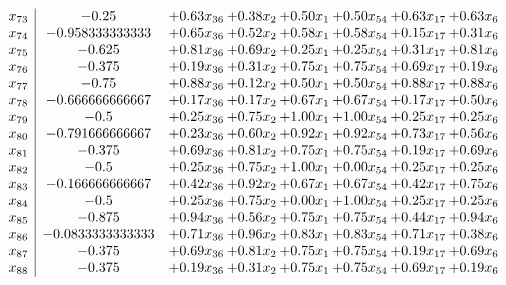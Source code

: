 \documentclass[8pt]{article}
\begin{document}
\[\begin{array}{c| c c@{\hskip 2pt} c@{\hskip 2pt} c@{\hskip 2pt} c@{\hskip 2pt} c@{\hskip 2pt} c@{\hskip 2pt} }
 x_{73}   &  -0.25 & +  0.63 x_{36} & +  0.38 x_{2} & +  0.50 x_{1} & +  0.50 x_{54} & +  0.63 x_{17} & +  0.63 x_{6}\\
 x_{74}   &  -0.958333333333 & +  0.65 x_{36} & +  0.52 x_{2} & +  0.58 x_{1} & +  0.58 x_{54} & +  0.15 x_{17} & +  0.31 x_{6}\\
 x_{75}   &  -0.625 & +  0.81 x_{36} & +  0.69 x_{2} & +  0.25 x_{1} & +  0.25 x_{54} & +  0.31 x_{17} & +  0.81 x_{6}\\
 x_{76}   &  -0.375 & +  0.19 x_{36} & +  0.31 x_{2} & +  0.75 x_{1} & +  0.75 x_{54} & +  0.69 x_{17} & +  0.19 x_{6}\\
 x_{77}   &  -0.75 & +  0.88 x_{36} & +  0.12 x_{2} & +  0.50 x_{1} & +  0.50 x_{54} & +  0.88 x_{17} & +  0.88 x_{6}\\
 x_{78}   &  -0.666666666667 & +  0.17 x_{36} & +  0.17 x_{2} & +  0.67 x_{1} & +  0.67 x_{54} & +  0.17 x_{17} & +  0.50 x_{6}\\
 x_{79}   &  -0.5 & +  0.25 x_{36} & +  0.75 x_{2} & +  1.00 x_{1} & +  1.00 x_{54} & +  0.25 x_{17} & +  0.25 x_{6}\\
 x_{80}   &  -0.791666666667 & +  0.23 x_{36} & +  0.60 x_{2} & +  0.92 x_{1} & +  0.92 x_{54} & +  0.73 x_{17} & +  0.56 x_{6}\\
 x_{81}   &  -0.375 & +  0.69 x_{36} & +  0.81 x_{2} & +  0.75 x_{1} & +  0.75 x_{54} & +  0.19 x_{17} & +  0.69 x_{6}\\
 x_{82}   &  -0.5 & +  0.25 x_{36} & +  0.75 x_{2} & +  1.00 x_{1} & +  0.00 x_{54} & +  0.25 x_{17} & +  0.25 x_{6}\\
 x_{83}   &  -0.166666666667 & +  0.42 x_{36} & +  0.92 x_{2} & +  0.67 x_{1} & +  0.67 x_{54} & +  0.42 x_{17} & +  0.75 x_{6}\\
 x_{84}   &  -0.5 & +  0.25 x_{36} & +  0.75 x_{2} & +  0.00 x_{1} & +  1.00 x_{54} & +  0.25 x_{17} & +  0.25 x_{6}\\
 x_{85}   &  -0.875 & +  0.94 x_{36} & +  0.56 x_{2} & +  0.75 x_{1} & +  0.75 x_{54} & +  0.44 x_{17} & +  0.94 x_{6}\\
 x_{86}   &  -0.0833333333333 & +  0.71 x_{36} & +  0.96 x_{2} & +  0.83 x_{1} & +  0.83 x_{54} & +  0.71 x_{17} & +  0.38 x_{6}\\
 x_{87}   &  -0.375 & +  0.69 x_{36} & +  0.81 x_{2} & +  0.75 x_{1} & +  0.75 x_{54} & +  0.19 x_{17} & +  0.69 x_{6}\\
 x_{88}   &  -0.375 & +  0.19 x_{36} & +  0.31 x_{2} & +  0.75 x_{1} & +  0.75 x_{54} & +  0.69 x_{17} & +  0.19 x_{6}\\

\end{array}\]
\end{document}
